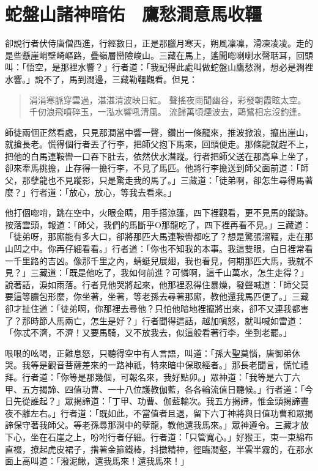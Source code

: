
\chapter{蛇盤山諸神暗佑　鷹愁澗意馬收韁}

卻說行者伏侍唐僧西進，行經數日，正是那臘月寒天，朔風凜凜，滑凍凌凌。走的是些懸崖峭壁崎嶇路，疊嶺層巒險峻山。三藏在馬上，遙聞唿喇喇水聲聒耳，回頭叫：「悟空，是那裡水響？」行者道：「我記得此處叫做蛇盤山鷹愁澗，想必是澗裡水響。」說不了，馬到澗邊，三藏勒韁觀看。但見：
\begin{quote}
涓涓寒脈穿雲過，湛湛清波映日紅。
聲搖夜雨聞幽谷，彩發朝霞眩太空。
千仞浪飛噴碎玉，一泓水響吼清風。
流歸萬頃煙波去，鷗鷺相忘沒釣逢。
\end{quote}

師徒兩個正然看處，只見那澗當中響一聲，鑽出一條龍來，推波掀浪，攛出崖山，就搶長老。慌得個行者丟了行李，把師父抱下馬來，回頭便走。那條龍就趕不上，把他的白馬連鞍轡一口吞下肚去，依然伏水潛蹤。行者把師父送在那高阜上坐了，卻來牽馬挑擔，止存得一擔行李，不見了馬匹。他將行李擔送到師父面前道：「師父，那孽龍也不見蹤影，只是驚走我的馬了。」三藏道：「徒弟啊，卻怎生尋得馬著麼？」行者道：「放心，放心，等我去看來。」

他打個唿哨，跳在空中，火眼金睛，用手搭涼篷，四下裡觀看，更不見馬的蹤跡。按落雲頭，報道：「師父，我們的馬斷乎O那龍吃了，四下裡再看不見。」三藏道：「徒弟呀，那廝能有多大口，卻將那匹大馬連鞍轡都吃了？想是驚張溜韁，走在那山凹之中。你再仔細看看。」行者道：「你也不知我的本事。我這雙眼，白日裡常看一千里路的吉凶。像那千里之內，蜻蜓兒展翅，我也看見，何期那匹大馬，我就不見？」三藏道：「既是他吃了，我如何前進？可憐啊，這千山萬水，怎生走得？」說著話，淚如雨落。行者見他哭將起來，他那裡忍得住暴燥，發聲喊道：「師父莫要這等膿包形麼，你坐著，坐著，等老孫去尋著那廝，教他還我馬匹便了。」三藏卻才扯住道：「徒弟啊，你那裡去尋他？只怕他暗地裡攛將出來，卻不又連我都害了？那時節人馬兩亡，怎生是好？」行者聞得這話，越加嗔怒，就叫喊如雷道：「你忒不濟，不濟！又要馬騎，又不放我去，似這般看著行李，坐到老罷。」

哏哏的吆喝，正難息怒，只聽得空中有人言語，叫道：「孫大聖莫惱，唐御弟休哭。我等是觀音菩薩差來的一路神祇，特來暗中保取經者。」那長老聞言，慌忙禮拜。行者道：「你等是那幾個，可報名來，我好點卯。」眾神道：「我等是六丁六甲、五方揭諦、四值功曹、一十八位護教伽藍，各各輪流值日聽候。」行者道：「今日先從誰起？」眾揭諦道：「丁甲、功曹、伽藍輪次。我五方揭諦，惟金頭揭諦晝夜不離左右。」行者道：「既如此，不當值者且退，留下六丁神將與日值功曹和眾揭諦保守著我師父。等老孫尋那澗中的孽龍，教他還我馬來。」眾神遵令。三藏才放下心，坐在石崖之上，吩咐行者仔細。行者道：「只管寬心。」好猴王，束一束綿布直裰，撩起虎皮裙子，揝著金箍鐵棒，抖擻精神，徑臨澗壑，半雲半霧的，在那水面上高叫道：「潑泥鰍，還我馬來！還我馬來！」

